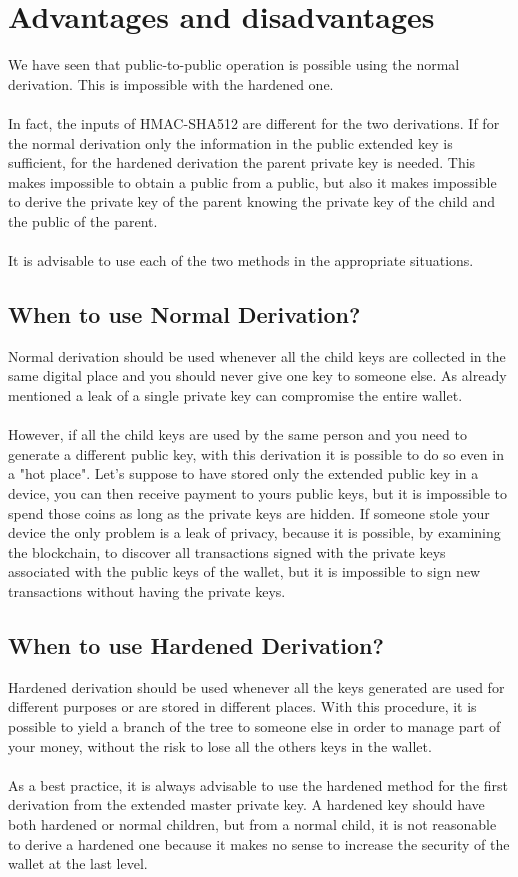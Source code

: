 \section{Advantages and disadvantages}
We have seen that public-to-public operation is possible using the normal derivation. This is impossible with the hardened one.
\\ \\
In fact, the inputs of HMAC-SHA512 are different for the two derivations. If for the normal derivation only the information in the public extended key is sufficient, for the hardened derivation the parent private key is needed. This makes impossible to obtain a public from a public, but also it makes impossible to derive the private key of the parent knowing the private key of the child and the public of the parent.
\\ \\
It is advisable to use each of the two methods in the appropriate situations.

\subsection{When to use Normal Derivation?}
Normal derivation should be used whenever all the child keys are collected in the same digital place and you should never give one key to someone else. As already mentioned a leak of a single private key can compromise the entire wallet.
\\ \\
However, if all the child keys are used by the same person and you need to generate a different public key, with this derivation it is possible to do so even in a "hot place". Let's suppose to have stored only the extended public key in a device, you can then receive payment to yours public keys, but it is impossible to spend those coins as long as the private keys are hidden. If someone stole your device the only problem is a leak of privacy, because it is possible, by examining the blockchain, to discover all transactions signed with the private keys associated with the public keys of the wallet, but it is impossible to sign new transactions without having the private keys.


\subsection{When to use Hardened Derivation?}
Hardened derivation should be used whenever all the keys generated are used for different purposes or are stored in different places. With this procedure, it is possible to yield a branch of the tree to someone else in order to manage part of your money, without the risk to lose all the others keys in the wallet.
\\ \\
As a best practice, it is always advisable to use the hardened method for the first derivation from the extended master private key. A hardened key should have both hardened or normal children, but from a normal child, it is not reasonable to derive a hardened one because it makes no sense to increase the security of the wallet at the last level.


